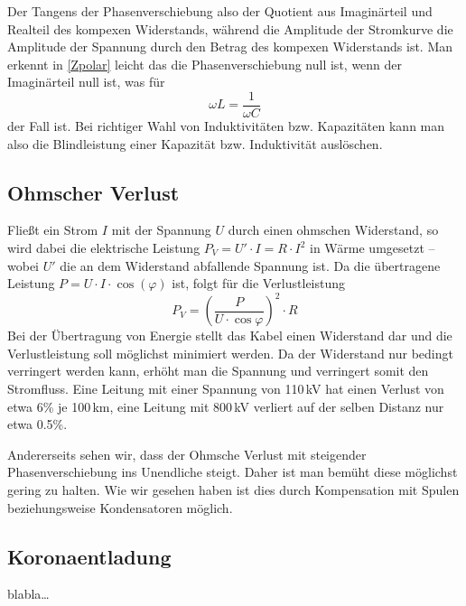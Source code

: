 Der Tangens der Phasenverschiebung also der Quotient aus Imaginärteil und Realteil des kompexen Widerstands, während die Amplitude der Stromkurve die Amplitude der Spannung durch den Betrag des kompexen Widerstands ist.
Man erkennt in \ref{Zpolar} leicht das die Phasenverschiebung null ist, wenn der Imaginärteil null ist, was für 
\begin{equation}
\omega L = \frac{1}{\omega C}
\end{equation}
der Fall ist. Bei richtiger Wahl von Induktivitäten bzw. Kapazitäten kann man also die Blindleistung einer Kapazität bzw. Induktivität auslöschen.

\subsection{Ohmscher Verlust}
Fließt ein Strom $I$ mit der Spannung $U$ durch einen ohmschen Widerstand, so wird dabei die elektrische Leistung
$P_V = U' \cdot I = R \cdot I^2$
in Wärme umgesetzt -- wobei $U'$ die an dem Widerstand abfallende Spannung ist.
Da die übertragene Leistung $P=U \cdot I \cdot \cos(\varphi)$ ist, folgt für die Verlustleistung
\[P_V = \left(\frac{P}{U \cdot \cos\varphi}\right)^2\cdot R\]
Bei der Übertragung von Energie stellt das Kabel einen Widerstand dar und die Verlustleistung soll möglichst minimiert werden. Da der Widerstand nur bedingt verringert werden kann, erhöht man die Spannung und verringert somit den Stromfluss. Eine Leitung mit einer Spannung von 110\,kV hat einen Verlust von etwa 6\% je 100\,km, eine Leitung mit 800\,kV verliert auf der selben Distanz nur etwa 0.5\%.

Andererseits sehen wir, dass der Ohmsche Verlust mit steigender Phasenverschiebung ins Unendliche steigt. Daher ist man bemüht diese möglichst gering zu halten. Wie wir gesehen haben ist dies durch Kompensation mit Spulen beziehungsweise Kondensatoren möglich.



\subsection{Koronaentladung}
blabla…
